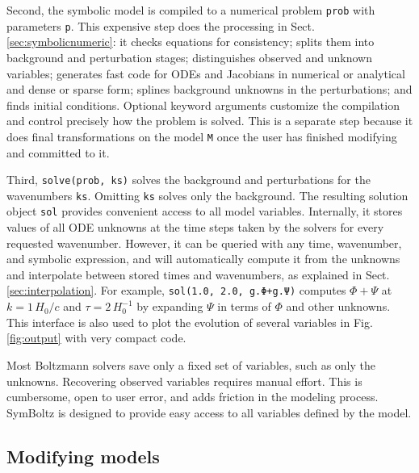 \documentclass{aa}
\begin{document}
Second, the symbolic model is compiled to a numerical problem \texttt{prob} with parameters \texttt{p}.
This expensive step does the processing in Sect. \ref{sec:symbolicnumeric}: it checks equations for consistency; splits them into background and perturbation stages; distinguishes observed and unknown variables; generates fast code for ODEs and Jacobians in numerical or analytical and dense or sparse form; splines background unknowns in the perturbations; and finds initial conditions.
Optional keyword arguments customize the compilation and control precisely how the problem is solved.
This is a separate step because it does final transformations on the model \texttt{M} once the user has finished modifying and committed to it.

Third, \texttt{solve(prob, ks)} solves the background and perturbations for the wavenumbers \texttt{ks}.
Omitting \texttt{ks} solves only the background.
The resulting solution object \texttt{sol} provides convenient access to all model variables.
Internally, it stores values of all ODE unknowns at the time steps taken by the solvers for every requested wavenumber.
However, it can be queried with any time, wavenumber, and symbolic expression, and will automatically compute it from the unknowns and interpolate between stored times and wavenumbers, as explained in Sect. \ref{sec:interpolation}.
For example, \texttt{sol(1.0, 2.0, g.Φ+g.Ψ)} computes $\Phi+\Psi$ at $k = 1 \, H_0/c$ and $\tau = 2 \, H_0^{-1}$ by expanding $\Psi$ in terms of $\Phi$ and other unknowns.
This interface is also used to plot the evolution of several variables in Fig. \ref{fig:output} with very compact code.

Most Boltzmann solvers save only a fixed set of variables, such as only the unknowns.
Recovering observed variables requires manual effort.
This is cumbersome, open to user error, and adds friction in the modeling process.
SymBoltz is designed to provide easy access to all variables defined by the model.

\subsection{Modifying models}
\label{sec:modifying}
\end{document}
